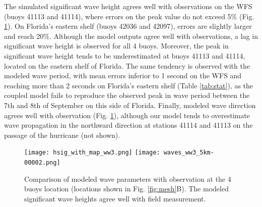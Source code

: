 \documentclass[preprint,12pt,authoryear]{elsarticle}
\begin{document}
The simulated significant wave height agrees well with observations on the WFS (buoys 41113 and 41114), where errors on the peak value do not exceed 5\% (Fig. \ref{fig:waves}). On Florida's eastern shelf (buoys 42036 and 42097), errors are slightly larger and reach 20\%. Although the model outputs agree well with observations, a lag in significant wave height is observed for all 4 buoys. Moreover, the peak in significant wave height tends to be underestimated at buoys 41113 and 41114, located on the eastern shelf of Florida. The same tendency is observed with the modeled wave period, with mean errors inferior to 1 second on the WFS and reaching more than 2 seconds on Florida's eastern shelf (Table \ref{tab:stat}), as the coupled model fails to reproduce the observed peak in wave period between the 7th and 8th of September on this side of Florida. Finally, modeled wave direction agrees well with observation (Fig. \ref{fig:waves}), although our model tends to overestimate wave propagation in the northward direction at stations 41114 and 41113 on the passage of the hurricane (not shown).

\begin{figure}
    \centering
    \texttt{[image: hsig\_with\_map\_ww3.png]}
    \texttt{[image: waves\_ww3\_5km-00002.png]}
    \caption{Comparison of modeled wave parameters with observation at the 4 buoys location (locations shown in Fig. \ref{fig:mesh}B). The modeled significant wave heights agree well with field measurement. }
    \label{fig:waves}
\end{figure}
\end{document}
